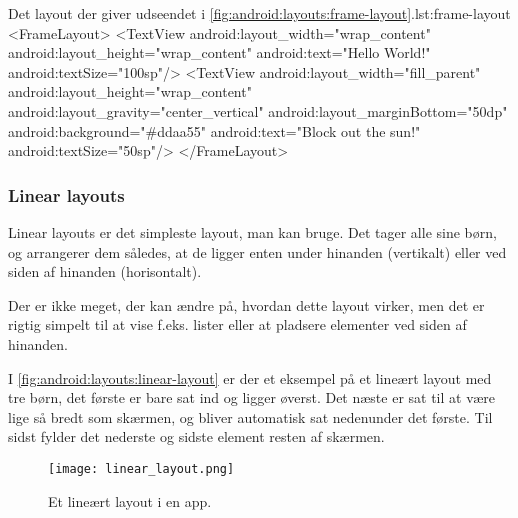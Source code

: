 \begin{XmlCode}{Det layout der giver udseendet i \autoref{fig:android:layouts:frame-layout}.}{lst:frame-layout}
	<FrameLayout>
		<TextView
			android:layout_width="wrap_content"
			android:layout_height="wrap_content"
			android:text="Hello World!"
			android:textSize="100sp"/>
		<TextView
			android:layout_width="fill_parent"
			android:layout_height="wrap_content"
			android:layout_gravity="center_vertical"
			android:layout_marginBottom="50dp"
			android:background="#ddaa55"
			android:text="Block out the sun!"
			android:textSize="50sp"/>
	</FrameLayout>
\end{XmlCode}

\clearpage
\FloatBarrier

\subsubsection{Linear layouts}
Linear layouts er det simpleste layout, man kan bruge. Det tager alle sine 
børn, og arrangerer dem således, at de ligger enten under hinanden (vertikalt) 
eller ved siden af hinanden (horisontalt).

Der er ikke meget, der kan ændre på, hvordan dette layout virker, men det er 
rigtig simpelt til at vise f.eks. lister eller at pladsere elementer ved siden 
af hinanden.

I \autoref{fig:android:layouts:linear-layout} er der et eksempel på et lineært 
layout med tre børn, det første er bare sat ind og ligger øverst. Det næste er 
sat til at være lige så bredt som skærmen, og bliver automatisk sat nedenunder 
det første. Til sidst fylder det nederste og sidste element resten af skærmen.

\begin{figure}[h]
	\begin{center}
		\texttt{[image: linear\_layout.png]}
		\caption{Et lineært layout i en app.}
		\label{fig:android:layouts:linear-layout}
	\end{center}
\end{figure}


